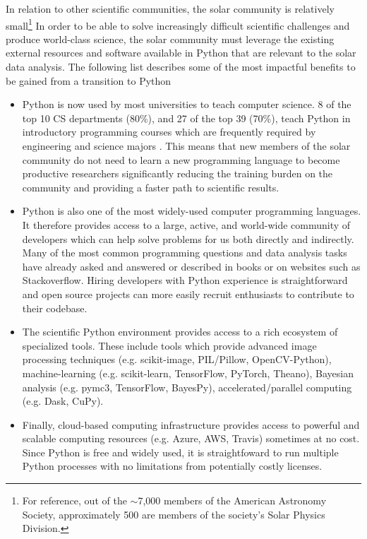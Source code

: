 In relation to other scientific communities, the solar community is relatively small\footnote{For reference, out of the $\sim$7,000 members of the American Astronomy Society, approximately 500 are members of the society's Solar Physics Division.}
In order to be able to solve increasingly difficult scientific challenges and produce world-class science, the solar community must leverage the existing external resources and software available in Python that are relevant to the solar data analysis.
The following list describes some of the most impactful benefits to be gained from a transition to Python

\begin{itemize}
  \item Python is now used by most universities to teach computer science. 8 of the top 10 CS departments (80\%), and 27 of the top 39 (70\%), teach Python in introductory programming courses which are frequently required by engineering and science majors \citep{guo2014}. This means that new members of the solar community do not need to learn a new programming language to become productive researchers significantly reducing the training burden on the community and providing a faster path to scientific results.
  \item Python is also one of the most widely-used computer programming languages. It therefore provides access to a large, active, and world-wide community of developers which can help solve problems for us both directly and indirectly. Many of the most common programming questions and data analysis tasks have already asked and answered or described in books or on websites such as Stackoverflow. Hiring developers with Python experience is straightforward and open source projects can more easily recruit enthusiasts to contribute to their codebase.
  \item The scientific Python environment provides access to a rich ecosystem of specialized tools. These include tools which provide advanced image processing techniques (e.g. scikit-image, PIL/Pillow, OpenCV-Python), machine-learning (e.g. scikit-learn, TensorFlow, PyTorch, Theano), Bayesian analysis (e.g. pymc3, TensorFlow, BayesPy), accelerated/parallel computing (e.g. Dask, CuPy).
  \item Finally, cloud-based computing infrastructure provides access to powerful and scalable computing resources (e.g. Azure, AWS, Travis) sometimes at no cost. Since Python is free and widely used, it is straightfoward to run multiple Python processes with no limitations from potentially costly licenses.
\end{itemize}

